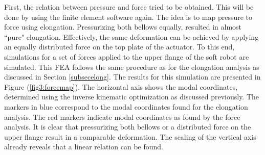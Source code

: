 First, the relation between pressure and force tried to be obtained. This will be done by using the finite element software again. The idea is to map pressure to force using elongation. Pressurizing both bellows equally, resulted in almost ``pure" elongation. Effectively, the same deformation can be achieved by applying an equally distributed force on the top plate of the actuator. To this end, simulations for a set of forces applied to the upper flange of the soft robot are simulated. This FEA follows the same procedure as for the elongation analysis as discussed in Section \ref{subsecelong}. The results for this simulation are presented in Figure (\ref{fig3:forcemap}). The horizontal axis shows the modal coordinates, determined using the inverse kinematic optimization as discussed previously. The markers in blue correspond to the modal coordinates found for the elongation analysis. The red markers indicate modal coordinates as found by the force analysis. It is clear that pressurizing both bellows or a distributed force on the upper flange result in a comparable deformation. The scaling of the vertical axis already reveals that a linear relation can be found.


